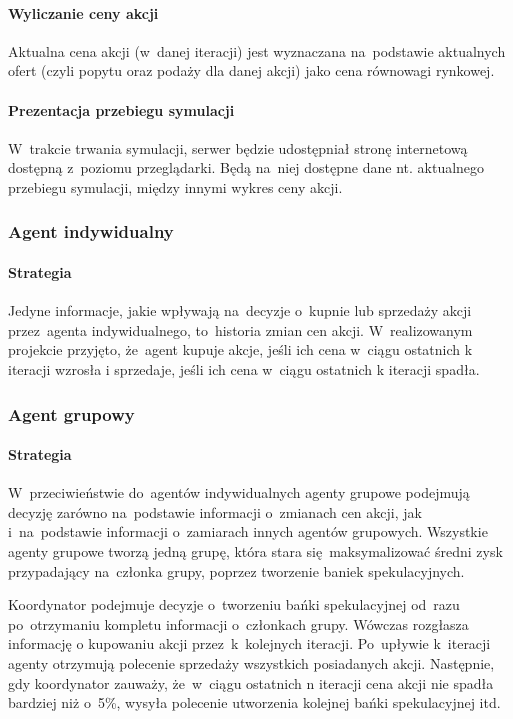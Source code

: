 \documentclass[11pt,a4paper]{article}
\begin{document}
\paragraph{Wyliczanie ceny akcji}
Aktualna cena akcji (w~danej iteracji) jest wyznaczana na~podstawie aktualnych ofert (czyli popytu oraz podaży
dla danej akcji) jako cena równowagi rynkowej.

\paragraph{Prezentacja przebiegu symulacji}
W~trakcie trwania symulacji, serwer będzie udostępniał stronę internetową dostępną z~poziomu przeglądarki. Będą na~niej dostępne dane nt. aktualnego przebiegu symulacji, między innymi wykres ceny akcji.

\subsubsection{Agent indywidualny}
\paragraph{Strategia}
Jedyne informacje, jakie wpływają na~decyzje o~kupnie lub sprzedaży akcji przez~agenta indywidualnego, to~historia zmian cen akcji. W~realizowanym projekcie przyjęto, że~agent kupuje akcje, jeśli ich cena w~ciągu ostatnich k iteracji wzrosła i sprzedaje, jeśli ich cena w~ciągu ostatnich k iteracji spadła.

\subsubsection{Agent grupowy}
\paragraph{Strategia}
W~przeciwieństwie do~agentów indywidualnych agenty grupowe podejmują decyzję zarówno na~podstawie informacji o~zmianach cen akcji, jak i~na~podstawie informacji o~zamiarach innych agentów grupowych. Wszystkie agenty grupowe tworzą jedną grupę, która stara się~maksymalizować średni zysk przypadający na~członka grupy, poprzez tworzenie baniek spekulacyjnych. 

Koordynator podejmuje decyzje o~tworzeniu bańki spekulacyjnej od~razu po~otrzymaniu kompletu informacji o~członkach grupy. Wówczas rozgłasza informację o kupowaniu akcji przez~k~kolejnych iteracji. Po~upływie k~iteracji agenty otrzymują polecenie sprzedaży wszystkich posiadanych akcji. Następnie, gdy koordynator zauważy, że~w~ciągu ostatnich n iteracji cena akcji nie spadła bardziej niż o~5\%, wysyła polecenie utworzenia kolejnej bańki spekulacyjnej itd.
\end{document}

